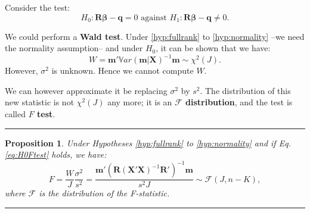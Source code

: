 \documentclass[
]{book}
\newtheorem{proposition}{Proposition}[chapter]
\theoremstyle{definition}
\theoremstyle{definition}
\theoremstyle{definition}
\theoremstyle{definition}
\theoremstyle{remark}
\begin{document}
Consider the test:
\begin{equation}
\boxed{H_0: \mathbf{R}\boldsymbol\beta - \mathbf{q} = 0 \mbox{ against } H_1: \mathbf{R}\boldsymbol\beta - \mathbf{q} \ne 0.}\label{eq:H0Ftest}
\end{equation}

We could perform a \textbf{Wald test}. Under \ref{hyp:fullrank} to \ref{hyp:normality} --we need the normality assumption-- and under \(H_0\), it can be shown that we have:
\begin{equation}
W = \mathbf{m}'\mathbb{V}ar(\mathbf{m}|\mathbf{X})^{-1}\mathbf{m} \sim \chi^2(J). \label{eq:W1}
\end{equation}
However, \(\sigma^2\) is unknown. Hence we cannot compute \(W\).

We can however approximate it be replacing \(\sigma^2\) by \(s^2\). The distribution of this new statistic is not \(\chi^2(J)\) any more;
it is an \textbf{\(\mathcal{F}\) distribution}, and the test is called \textbf{\(F\) test}.

\begin{center}\rule{0.5\linewidth}{0.5pt}\end{center}

\begin{proposition}
\protect\hypertarget{prp:Ftest1}{}\label{prp:Ftest1}Under Hypotheses \ref{hyp:fullrank} to \ref{hyp:normality} and if Eq. \eqref{eq:H0Ftest} holds, we have:
\begin{equation}
F = \frac{W}{J}\frac{\sigma^2}{s^2} = \frac{\mathbf{m}'(\mathbf{R}(\mathbf{X}'\mathbf{X})^{-1}\mathbf{R}')^{-1}\mathbf{m}}{s^2J} \sim \mathcal{F}(J,n-K),\label{eq:defFstatistics}
\end{equation}
where \(\mathcal{F}\) is the distribution of the F-statistic.
\end{proposition}

\begin{center}\rule{0.5\linewidth}{0.5pt}\end{center}
\end{document}
